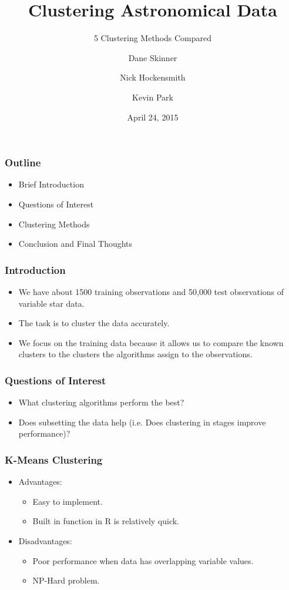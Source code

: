 \documentclass{beamer}
\title 
{Clustering Astronomical Data}
\subtitle
{5 Clustering Methods Compared}
\author{Dane Skinner \and Nick Hockensmith \and Kevin Park}
\institute
{Oregon State University}
\date
{April 24, 2015}
\begin{document}
\begin{frame}
 \titlepage
\end{frame}

\begin{frame}
\frametitle{Outline}
\begin{itemize}
\item Brief Introduction
\item Questions of Interest
\item Clustering Methods
\item Conclusion and Final Thoughts
\end{itemize}
\end{frame}
\begin{frame}
\frametitle{Introduction}
\begin{itemize}
\item We have about 1500 training observations and 50,000 test observations of variable star data.
\item The task is to cluster the data accurately.
\item We focus on the training data because it allows us to compare the known clusters to the clusters the algorithms assign to the observations.
\end{itemize}

\end{frame}


\begin{frame}
\frametitle{Questions of Interest}
\begin{itemize}
\item What clustering algorithms perform the best?
\item Does subsetting the data help (i.e. Does clustering in stages improve performance)?
\end{itemize}
\end{frame}


\begin{frame}
\frametitle{K-Means Clustering}
\begin{itemize}
\item Advantages: 
\begin{itemize}
\item Easy to implement. 
\item Built in function in R is relatively quick.
\end{itemize}
\item Disadvantages: 
\begin{itemize}
\item Poor performance when data has overlapping variable values.
\item NP-Hard problem.
\end{itemize}
\end{itemize}
\end{frame}
\end{document}

